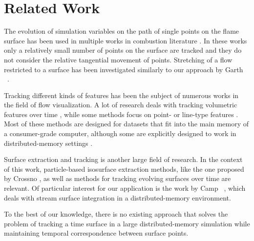 %
\section{Related Work} %
\label{sec:fst_background_and_related_work}
%
The evolution of simulation variables on the path of single points on the flame
surface has been used in multiple works in combustion literature
\cite{Yeung1990,Sripakagorn2004,Scholtissek2017}.
%
In these works only a relatively small number of points on the surface are
tracked and they do not consider the relative tangential movement of points.
%
Stretching of a flow restricted to a surface has been investigated similarly to
our approach by Garth \etal~\cite{Garth2008}.
%

%
Tracking different kinds of features has been the subject of numerous works in
the field of flow visualization.
%
A lot of research deals with tracking volumetric features over time
\cite{Silver1997,Sauer2014,Clyne2013,Mascarenhas2009,Duque2012,Muelder2009},
while some methods focus on point-\cite{Garth2004,Theisel2003a} or line-type
features \cite{Bremer2010}.
%
Most of these methods are designed for datasets that fit into the main memory of
a consumer-grade computer, although some are explicitly designed to work in
distributed-memory settings \cite{Wang2013}.
%

%
Surface extraction and tracking is another large field of research.
%
In the context of this work, particle-based isosurface extraction methods, like
the one proposed by Crossno \etal \cite{Crossno1997}, as well as methods for
tracking evolving surfaces over time \cite{Krishnan2009,Buerger2009,Berres2015}
are relevant.
%
Of particular interest for our application is the work by Camp
\etal~\cite{Camp2012}, which deals with stream surface integration in a
distributed-memory environment.
%

%
To the best of our knowledge, there is no existing approach that solves the
problem of tracking a time surface in a large distributed-memory simulation
while maintaining temporal correspondence between surface points.
%
